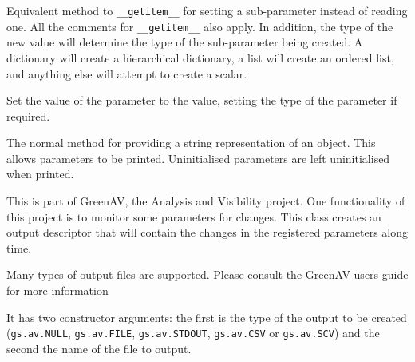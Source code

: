 \documentclass[12pt,oneside]{gsbook}
\begin{document}
\begin{methods}
 {Equivalent method to \texttt{\_\_getitem\_\_}
for setting a sub-parameter instead of reading one.  All the comments for
\texttt{\_\_getitem\_\_} also apply.  In addition, the type of the new value
will determine the type of the sub-parameter being created.  A dictionary will
create a hierarchical dictionary, a list will create an ordered list, and
anything else will attempt to create a scalar.}

 {Set the value of the parameter to the value, setting the
type of the parameter if required.}

 {The normal method for providing a string representation
of an object.  This allows parameters to be printed.  Uninitialised parameters
are left uninitialised when printed.}

\end{methods}



\newpage
{} { This is part of GreenAV, the Analysis and
Visibility project. One functionality of this project is to monitor
some parameters for changes. This class creates an output descriptor
that will contain the changes in the registered parameters along time.

Many types of output files are supported. Please consult the GreenAV
users guide for more information

It has two constructor arguments: the first is the type of the output
to be created (\texttt{gs.av.NULL}, \texttt{gs.av.FILE},
\texttt{gs.av.STDOUT}, \texttt{gs.av.CSV} or \texttt{gs.av.SCV}) and
the second the name of the file to output.}
\end{document}
